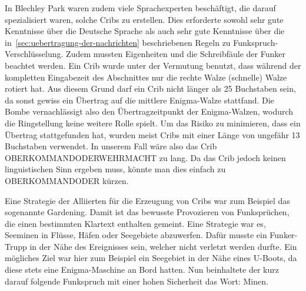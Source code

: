 In Blechley Park waren zudem viele Sprachexperten beschäftigt, die darauf spezialisiert waren, solche Cribs zu erstellen.
Dies erforderte sowohl sehr gute Kenntnisse über die Deutsche Sprache als auch sehr gute Kenntnisse über die in~\cref{sec:uebertragung-der-nachrichten}
beschriebenen Regeln zu Funkspruch-Verschlüsselung.
Zudem mussten Eigenheiten und die \glqq Schreibfäule\grqq{} der Funker beachtet werden.
Ein Crib wurde unter der Vermutung benutzt, dass während der kompletten Eingabezeit des Abschnittes nur die rechte Walze (schnelle) Walze rotiert hat.
Aus diesem Grund darf ein Crib nicht länger als 25 Buchstaben sein, da sonst gewiss ein Übertrag auf die mittlere Enigma-Walze stattfand.
Die Bombe vernachlässigt also den Übertragzeitpunkt der Enigma-Walzen, wodurch die Ringstellung keine weitere Rolle spielt.
Um das Risiko zu minimieren, dass ein Übertrag stattgefunden hat, wurden meist Cribs mit einer Länge von ungefähr 13 Buchstaben verwendet.
In unserem Fall wäre also das Crib \glqq OBERKOMMANDODERWEHRMACHT\grqq{} zu lang.
Da das Crib jedoch keinen linguistischen Sinn ergeben muss, könnte man dies einfach zu \glqq OBERKOMMANDODER\grqq{} kürzen.

Eine Strategie der Alliierten für die Erzeugung von Cribs war zum Beispiel das sogenannte \glqq Gardening\grqq.
Damit ist das bewusste Provozieren von Funksprüchen, die einen bestimmten Klartext enthalten gemeint.
Eine Strategie war es, Seeminen in Flüsse, Häfen oder Seegebiete abzuwerfen.
Dafür musste ein Funker-Trupp in der Nähe des Ereignisses sein, welcher nicht verletzt werden durfte.
Ein mögliches Ziel war hier zum Beispiel ein Seegebiet in der Nähe eines U-Boots, da diese stets eine Enigma-Maschine an Bord hatten.
Nun beinhaltete der kurz darauf folgende Funkspruch mit einer hohen Sicherheit das Wort: \glqq Minen\grqq.

\newpage
